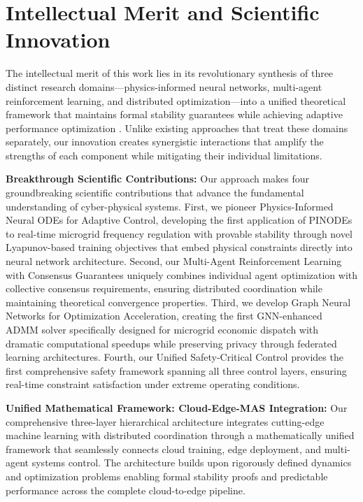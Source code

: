 \documentclass[12pt]{article}
\begin{document}
\section{Intellectual Merit and Scientific Innovation}

The intellectual merit of this work lies in its revolutionary synthesis of three distinct research domains---physics-informed neural networks, multi-agent reinforcement learning, and distributed optimization---into a unified theoretical framework that maintains formal stability guarantees while achieving adaptive performance optimization \cite{bevrani2021,palizban2014}. Unlike existing approaches that treat these domains separately, our innovation creates synergistic interactions that amplify the strengths of each component while mitigating their individual limitations.

\textbf{Breakthrough Scientific Contributions:} Our approach makes four groundbreaking scientific contributions that advance the fundamental understanding of cyber-physical systems. First, we pioneer Physics-Informed Neural ODEs for Adaptive Control, developing the first application of PINODEs to real-time microgrid frequency regulation with provable stability through novel Lyapunov-based training objectives that embed physical constraints directly into neural network architecture. Second, our Multi-Agent Reinforcement Learning with Consensus Guarantees uniquely combines individual agent optimization with collective consensus requirements, ensuring distributed coordination while maintaining theoretical convergence properties. Third, we develop Graph Neural Networks for Optimization Acceleration, creating the first GNN-enhanced ADMM solver specifically designed for microgrid economic dispatch with dramatic computational speedups while preserving privacy through federated learning architectures. Fourth, our Unified Safety-Critical Control provides the first comprehensive safety framework spanning all three control layers, ensuring real-time constraint satisfaction under extreme operating conditions.

\textbf{Unified Mathematical Framework: Cloud-Edge-MAS Integration:} Our comprehensive three-layer hierarchical architecture integrates cutting-edge machine learning with distributed coordination through a mathematically unified framework that seamlessly connects cloud training, edge deployment, and multi-agent systems control. The architecture builds upon rigorously defined dynamics and optimization problems enabling formal stability proofs and predictable performance across the complete cloud-to-edge pipeline.
\end{document}
